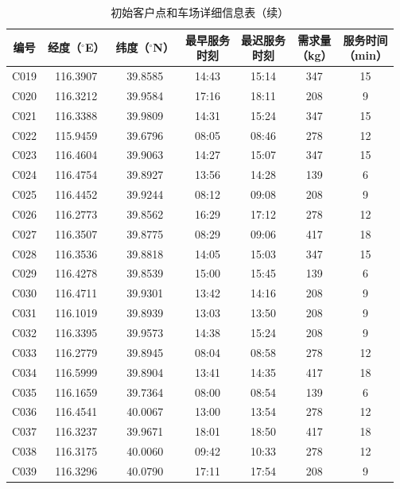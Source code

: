 \documentclass{setp-new}
\begin{document}
\begin{table}[H]
\ContinuedFloat
\centering
\caption[]{初始客户点和车场详细信息表（续）}
\small
\renewcommand{\arraystretch}{0.88}
\setlength{\tabcolsep}{1.2pt}
\begin{tabular*}{\textwidth}{@{\extracolsep{\fill}}ccccccc@{}}
\toprule
编号 & 经度（$^{\circ}$E） & 纬度（$^{\circ}$N） & \makecell{最早服务\\时刻} & \makecell{最迟服务\\时刻} & \makecell{需求量\\（kg）} & \makecell{服务时间\\（min）}\\
\midrule
C019 & 116.3907 & 39.8585 & 14:43 & 15:14 & 347 & 15\\
C020 & 116.3212 & 39.9584 & 17:16 & 18:11 & 208 & 9\\
C021 & 116.3388 & 39.9809 & 14:31 & 15:24 & 347 & 15\\
C022 & 115.9459 & 39.6796 & 08:05 & 08:46 & 278 & 12\\
C023 & 116.4604 & 39.9063 & 14:27 & 15:07 & 347 & 15\\
C024 & 116.4754 & 39.8927 & 13:56 & 14:28 & 139 & 6\\
C025 & 116.4452 & 39.9244 & 08:12 & 09:08 & 208 & 9\\
C026 & 116.2773 & 39.8562 & 16:29 & 17:12 & 278 & 12\\
C027 & 116.3507 & 39.8775 & 08:29 & 09:06 & 417 & 18\\
C028 & 116.3536 & 39.8818 & 14:05 & 15:03 & 347 & 15\\
C029 & 116.4278 & 39.8539 & 15:00 & 15:45 & 139 & 6\\
C030 & 116.4711 & 39.9301 & 13:42 & 14:16 & 208 & 9\\
C031 & 116.1019 & 39.8939 & 13:03 & 13:50 & 208 & 9\\
C032 & 116.3395 & 39.9573 & 14:38 & 15:24 & 208 & 9\\
C033 & 116.2779 & 39.8945 & 08:04 & 08:58 & 278 & 12\\
C034 & 116.5999 & 39.8904 & 13:41 & 14:35 & 417 & 18\\
C035 & 116.1659 & 39.7364 & 08:00 & 08:54 & 139 & 6\\
C036 & 116.4541 & 40.0067 & 13:00 & 13:54 & 278 & 12\\
C037 & 116.3237 & 39.9671 & 18:01 & 18:50 & 417 & 18\\
C038 & 116.3175 & 40.0060 & 09:42 & 10:33 & 278 & 12\\
C039 & 116.3296 & 40.0790 & 17:11 & 17:54 & 208 & 9\\

\end{tabular*}
\end{table}
\end{document}
